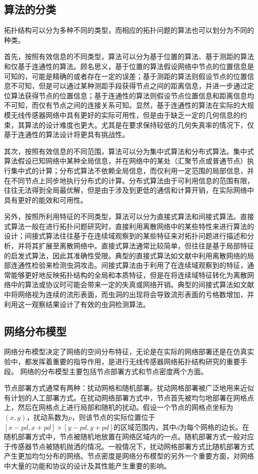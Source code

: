 \subsection{算法的分类}
拓扑结构可以分为多种不同的类型，而相应的拓扑问题的算法也可以划分为不同的种类。

首先，按照有效信息的不同类型，算法可以分为基于位置的算法、基于测距的算法和仅基于连通性的算法。顾名思义，基于位置的算法假设网络中节点的位置信息是可知的，可能是精确的或者存在一定的误差；基于测距的算法则假设节点的位置信息不可知，但是可以通过某种测距手段获得节点之间的距离信息，并进一步通过定位算法获得节点的位置信息；基于连通性的算法则假设节点位置信息和距离信息均不可知，而仅有节点之间的连接关系可知。显然，基于连通性的算法在实际的大规模无线传感器网络中具有更好的实际可用性，但是由于缺乏一定的几何信息的约束，其算法的设计难度也更大。尤其是在要求保持较低的几何失真率的情况下，仅基于连通性的算法设计将更具有挑战性。

其次，按照有效信息的不同范围，算法可以分为集中式算法和分布式算法。集中式算法假设已知网络中某种全局信息，并在网络中的某处（汇聚节点或普通节点）执行集中式的计算；分布式算法不依赖全局信息，而仅利用一定范围的局部信息，并在不同节点上同步地执行分布式的计算。分布式算法由于可利用信息的范围有限，往往无法得到全局最优解，但是由于涉及到更低的通信和计算开销，在实际网络中具有更好的能效和可用性。

另外，按照所利用特征的不同类型，算法可以分为直接式算法和间接式算法。直接式算法一般在进行拓扑问题研究时，直接利用离散网络中的某些特性来进行算法的设计；间接式算法往往基于在连续域观察到的某些特征来对拓扑问题进行描述和分析，并将其扩展至离散网络中。直接式算法通常比较简单，但往往是基于局部特征的启发式算法，因此其准确性受限。典型的直接式算法如文献中利用离散网络的局部连通性检验来检测虫洞攻击。间接式算法由于利用了在连续域观察到的特征，通常能够更好地反映拓扑结构的全局和本质特征，但是在将连续域特征转化为离散网络中的算法或协议时可能会带来一定的失真或网络开销。典型的间接式算法如文献中将网络视为连续的流形表面，而虫洞的出现将会导致流形表面的亏格数增加，并利用这一观察结果设计了有效的虫洞检测算法。
\subsection{网络分布模型}
网络分布模型决定了网络的空间分布特征，无论是在实际的网络部署还是在仿真实验中，都发挥着重要的指导作用，是进行无线传感器网络拓扑结构研究的重要手段。
网络的分布模型主要包括节点部署方式和节点密度两个方面。

节点部署方式通常有两种：扰动网格和随机部署。扰动网格部署被广泛地用来近似有计划的人工部署方式。在扰动网络部署方式中，节点首先被均匀地部署在网格点上，然后在网格点上进行局部和随机的扰动。假设一个节点的网格点坐标为$(x,y)$，扰动系数为$p$，则该节点的实际位置位于$[x-pd,x+pd]\times[y-pd,y+pd]$的区域范围内，其中$d$为每个网格的边长。在随机部署方式中，节点被随机地放置在网络区域内的一点。随机部署方式一般对应于传感器节点被随机抛洒的情况。一般情况下，扰动网格部署方式比随机部署方式产生更加均匀分布的网络。节点密度是网络分布模型的另外一个重要方面，对网络中大量的功能和协议的设计及其性能产生重要的影响。


